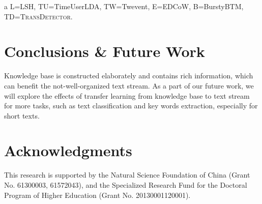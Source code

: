 \documentclass[runningheads,a4paper]{llncs}
\theoremstyle{exampstyle}
\begin{document}
\begin{table}
{\begin{threeparttable}
\begin{tablenotes}  
\item[a] L=LSH\cite{Petrovic:2010uj}, TU=TimeUserLDA\cite{Diao:2012wj}, TW=Twevent\cite{Twevent2012}, E=EDCoW\cite{Weng:2011wz}, B=BurstyBTM\cite{Yan:2015wm}, TD=\textsc{TransDetector}.
\end{tablenotes}  
\end{threeparttable}  
}
\end{table}

\section{Conclusions \& Future Work}
Knowledge base is constructed elaborately and contains rich information, which can benefit the not-well-organized text stream. 
As a part of our future work, we will explore the effects of transfer learning from knowledge base to text stream for more tasks, such as text classification and key words extraction, especially for short texts. 

\section*{Acknowledgments}\label{sec:Acknowledgments}
This research is supported by the Natural Science Foundation of China (Grant No. 61300003, 61572043), and the Specialized Research Fund for the Doctoral Program of Higher Education (Grant No. 20130001120001).


\small

\end{document}
